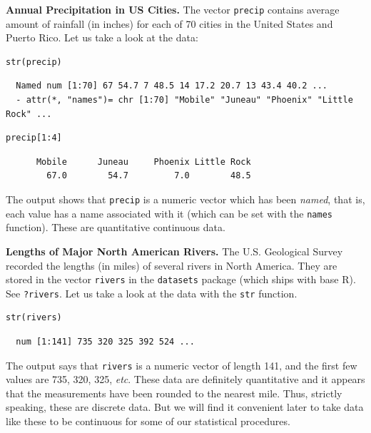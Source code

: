 \documentclass[captions=tableheading]{scrbook}
\begin{document}
\begin{example}
\textbf{Annual Precipitation in US Cities.} The vector \texttt{precip} contains average amount of rainfall (in inches) for each of 70 cities in the United States and Puerto Rico. Let us take a look at the data:


\begin{verbatim}
str(precip)
\end{verbatim}

\begin{verbatim}
  Named num [1:70] 67 54.7 7 48.5 14 17.2 20.7 13 43.4 40.2 ...
  - attr(*, "names")= chr [1:70] "Mobile" "Juneau" "Phoenix" "Little Rock" ...
\end{verbatim}


\begin{verbatim}
precip[1:4]
\end{verbatim}

\begin{verbatim}
      Mobile      Juneau     Phoenix Little Rock 
        67.0        54.7         7.0        48.5
\end{verbatim}

The output shows that \texttt{precip} is a numeric vector which has been \emph{named}, that is, each value has a name associated with it (which can be set with the \texttt{names} function). These are quantitative continuous data.

\end{example}

\begin{example}
\textbf{Lengths of Major North American Rivers.} The U.S. Geological Survey recorded the lengths (in miles) of several rivers in North America. They are stored in the vector \texttt{rivers} in the \texttt{datasets} package (which ships with base \textsf{R}). See \texttt{?rivers}. Let us take a look at the data with the \texttt{str} function.


\begin{verbatim}
str(rivers)
\end{verbatim}

\begin{verbatim}
  num [1:141] 735 320 325 392 524 ...
\end{verbatim}

The output says that \texttt{rivers} is a numeric vector of length 141, and the first few values are 735, 320, 325, \emph{etc}. These data are definitely quantitative and it appears that the measurements have been rounded to the nearest mile. Thus, strictly speaking, these are discrete data. But we will find it convenient later to take data like these to be continuous for some of our statistical procedures. 
\end{example}
\end{document}

